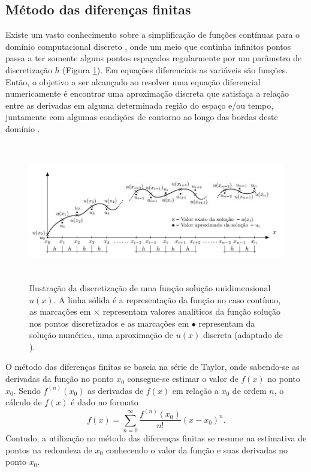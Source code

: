 \documentclass[
	12pt,				%
	openright,			%
	oneside,			%
	a4paper,			%
	english,			%
	brazil				%
	]{abntex2}
\begin{document}
\subsection*{Método das diferenças finitas}

	Existe um vasto conhecimento sobre a simplificação de funções contínuas para o domínio computacional discreto \cite{oppenheim1999discrete,hayes1999schaum}, onde um meio que continha infinitos pontos passa a ter somente alguns pontos espaçados regularmente por um parâmetro de discretização $h$ (Figura \ref{mdf1d}). Em equações diferenciais as variáveis são funções. Então, o objetivo a ser alcançado ao resolver uma equação diferencial numericamente é encontrar uma aproximação discreta que satisfaça a relação entre as derivadas em
	alguma determinada região do espaço e/ou tempo, juntamente com algumas condições de contorno ao longo das bordas deste domínio \cite{leveque1998finite}.
%
    \begin{figure}[htp!]
		\centering
		\includegraphics[width=16cm,height=6cm]{../imagens/1.jpg}
		\caption{Ilustração da discretização de uma função solução unidimensional $u(x)$. A linha sólida é a representação da função no caso contínuo, as marcações em $\times$ representam valores analíticos da função solução nos pontos discretizados e as marcações em $\bullet$ representam da solução numérica, uma aproximação de $u(x)$ discreta (adaptado de ).}
		\label{mdf1d}
	\end{figure}
%

	O método das diferenças finitas se baseia na série de Taylor, onde sabendo-se as derivadas da função no ponto $x_0$ consegue-se estimar o valor de $f(x)$ no ponto $x_0$. Sendo  $f^{(n)}(x_0)$ as derivadas de $f(x)$ em relação a $x_0$ de ordem $n$, o cálculo de $f(x)$ é dado no formato   
%
	\begin{equation}
		f(x) = \displaystyle\sum_{n=0}^{\infty} \dfrac{f^{(n)} (x_0)}{n!}(x - x_0)^n.
	\end{equation}
%
	\noindent Contudo, a utilização no método das diferenças finitas se resume na estimativa de pontos na redondeza de $x_0$ conhecendo o valor da função e suas derivadas no ponto $x_0$. 
	
\end{document}
